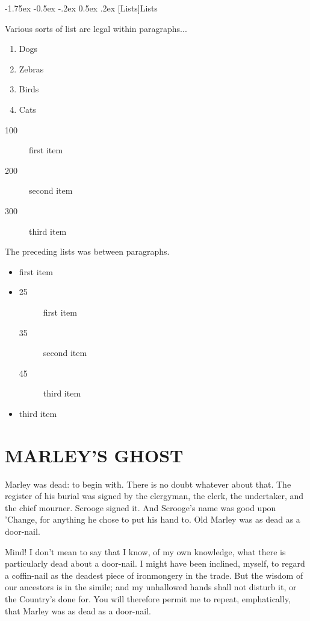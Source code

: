 \documentclass[11pt,twoside]{article}\makeatletter
\makeatletter
\renewcommand\section{\@startsection {section}{1}{\z@}%
     {-1.75ex \@plus -0.5ex \@minus -.2ex}%
     {0.5ex \@plus .2ex}%
     {\reset@font\Large\bfseries\sffamily}}
\renewcommand\subsection{\@startsection{subsection}{2}{\z@}%
     {-1.75ex\@plus -0.5ex \@minus- .2ex}%
     {0.5ex \@plus .2ex}%
     {\reset@font\Large\sffamily}}
\def\DivI{\section}
\def\DivII{\subsection}
\def\DivI{\chapter}
\def\DivII{\section}
\makeatother
\begin{document}
\DivII[Lists]{Lists}\label{P1}\par
Various sorts of list are legal within paragraphs... \begin{enumerate}

\item Dogs
\item Zebras
\item Birds
\item Cats
\end{enumerate}\begin{description}

\item[100]first item 
\item[200]second item 
\item[300]third item 
\end{description} \par
The preceding lists was between paragraphs.\par
{} \begin{itemize}

\item first item 
\item \begin{description}

\item[25]first item 
\item[35]second item 
\item[45]third item 
\end{description} 
\item third item 
\end{itemize} 
\DivI[MARLEY'S GHOST]{MARLEY'S GHOST}\label{S1}\par
Marley was dead: to begin with. There is no doubt whatever about that. The register of his burial was signed by the clergyman, the clerk, the undertaker, and the chief mourner. Scrooge signed it. And Scrooge's name was good upon 'Change, for anything he chose to put his hand to. Old Marley was as dead as a door-nail. \par
Mind! I don't mean to say that I know, of my own knowledge, what there is particularly dead about a door-nail. I might have been inclined, myself, to regard a coffin-nail as the deadest piece of ironmongery in the trade. But the wisdom of our ancestors is in the simile; and my unhallowed  hands shall not disturb it, or the Country's done for. You will therefore permit me to repeat, emphatically, that Marley was as dead as a door-nail.\par
\end{document}
